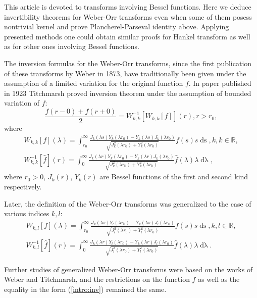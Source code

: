 \documentclass[manuscript, printscheme]{paper}
\newcommand{\RM}{\mathbb{R}}
\newcommand{\ds}{\operatorname{ds}}
\newcommand{\dlambda}{\operatorname{d\lambda}}
\begin{document}
This article is devoted to transforms involving Bessel functions. Here we deduce invertibility theorems for Weber-Orr transforms even when some of them posess nontrivial kernel and prove Plancherel-Parseval identity above.  Applying presented methods one could obtain similar proofs for Hankel transform as well as for other ones involving Bessel functions.	

The inversion formulas for the Weber-Orr transforms, since the first publication of these transforms by Weber in 1873, have traditionally been given under the assumption of a limited variation for the original function $f$. In paper \cite{Tm} published in 1923 Titchmarsh proved inversion theorem under the assumption of bounded variation of $f$: 
\begin{equation}\label{intro:inv}
\frac{f(r-0)+f(r+0)}2 = W_{k,k}^{-1}\left [ W_{k,k}[f]\right ](r), r>r_0,
\end{equation}
where
\begin{align}\label{intro:weberorr}
W_{k,k}[f](\lambda) = \int_{r_0}^\infty \frac{J_{k}(\lambda s)Y_{k}(\lambda r_0) - Y_{k}(\lambda s)J_{k}(\lambda r_0)}{\sqrt{J_{k}^2(\lambda r_0) + Y_{k}^2(\lambda r_0)}} f(s) s \ds,k,k\in \RM,
\\ \label{int:weberorrinv}
W^{-1}_{k,k}[\hat f](r) = \int_{0}^\infty \frac{J_{k}(\lambda r)Y_{k}(\lambda r_0) - Y_{k}(\lambda r)J_{k}(\lambda r_0)}{\sqrt{J_{k}^2(\lambda r_0) + Y_{k}^2(\lambda r_0)}} \hat f (\lambda) \lambda \dlambda,
\end{align}
where $r_0>0$, $J_k(r)$, $Y_k(r)$ are Bessel functions of the first and second kind respectively.

Later, the definition of the Weber-Orr transforms was generalized to the case of various indices $k,l$:
\begin{align}\label{int:weberorr}
W_{k,l}[f](\lambda) = \int_{r_0}^\infty \frac{J_{k}(\lambda s)Y_{l}(\lambda r_0) - Y_{k}(\lambda s)J_{l}(\lambda r_0)}{\sqrt{J_{l}^2(\lambda r_0) + Y_{l}^2(\lambda r_0)}} f(s) s \ds,k,l\in \RM,
\\ \label{int:weberorrinv}
W^{-1}_{k,l}[\hat f](r) = \int_{0}^\infty \frac{J_{k}(\lambda r)Y_{l}(\lambda r_0) - Y_{k}(\lambda r)J_{l}(\lambda r_0)}{\sqrt{J_{l}^2(\lambda r_0) + Y_{l}^2(\lambda r_0)}} \hat f (\lambda) \lambda \dlambda.
\end{align}
	
Further studies of generalized Weber-Orr transforms were based on the works of Weber and Titchmarsh, and the restrictions on the  function $f$ as well as the equality in the form (\ref{intro:inv}) remained the same.
\end{document}
